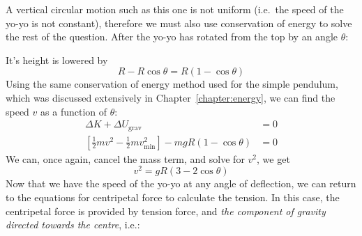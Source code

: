 \begin{example}[Yo-Yo]
  A vertical circular motion such as this one is not uniform (i.e.\ the speed of
  the yo-yo is not constant), therefore we must also use conservation of energy
  to solve the rest of the question. After the yo-yo has rotated from the top
  by an angle $\theta$:
  \begin{center}
  \end{center}
  It's height is lowered by
  \begin{displaymath}
    R-R\cos\theta=R(1-\cos\theta)
  \end{displaymath}
  Using the same conservation of energy method used for the simple pendulum,
  which was discussed extensively in Chapter~\ref{chapter:energy}, we can find
  the speed $v$ as a function of $\theta$:
  \begin{align*}
    \Delta K + \Delta U_\text{grav} &=0 \\
    \left[\frac12mv^2-\frac12mv_\text{min}^2\right]-mgR(1-\cos\theta) &=0
  \end{align*}
  We can, once again, cancel the mass term, and solve for $v^2$, we get
  \begin{displaymath}
    v^2=gR(3-2\cos\theta)
  \end{displaymath}
  Now that we have the speed of the yo-yo at any angle of deflection, we can
  return to the equations for centripetal force to calculate the tension. In
  this case, the centripetal force is provided by tension force, and
  \emph{the component of gravity directed towards the centre}, i.e.:

\end{example}
